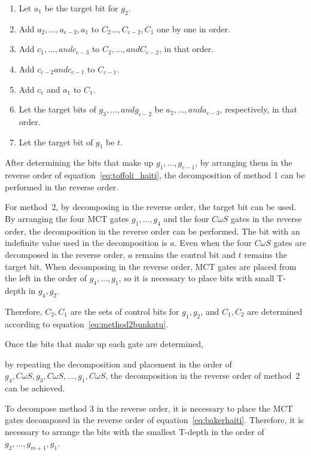 \begin{enumerate}[Step 1]

\item Let $a_{1}$ be the target bit for $g_{2}$.

\item Add $a_{2},\dots,a_{c-2},a_{1}$ to $C_{2}\dots,C_{c-2},C_{1}$ one by one in order.

\item Add $c_{1}, \dots , and c_{c-3}$ to $C_{2}, \dots , and C_{c-2}$, in that order.
\item Add $c_{c-2} and c_{c-1}$ to $C_{c-1}$.
\item Add $c_{c}$ and $a_{1}$ to $C_{1}$.
\item Let the target bits of $g_{3}, \dots , and g_{c-2}$ be $a_{2}, \dots , and a_{c-3}$, respectively, in that order.
\item Let the target bit of $g_{1}$ be $t$.
\end{enumerate}
After determining the bits that make up $g_{1},\dots, g_{c-1}$,
by arranging them in the reverse order of equation~\ref{eq:toffoli_haiti},
the decomposition of method 1 can be performed in the reverse order.
\par
For method~2, by decomposing in the reverse order, the target bit can be used.
By arranging the four MCT gates $g_{1},\dots, g_{4}$ and the four $C\omega S$ gates in the reverse order, the decomposition in the reverse order can be performed.
The bit with an indefinite value used in the decomposition is $a$.
Even when the four $C\omega S$ gates are decomposed in the reverse order, $a$ remains the control bit and $t$ remains the target bit.
When decomposing in the reverse order, MCT gates are placed from the left in the order of $g_{4}, \dots, g_{1}$, so it is necessary to place bits with small T-depth in $g_{4}, g_{2}$.

Therefore, $C_{2}, C_{1}$ are the sets of control bits for $g_{1}, g_{2}$,
and $C_{1}, C_{2}$ are determined according to equation~\ref{eq:method2bunkatu}.

Once the bits that make up each gate are determined,

by repeating the decomposition and placement in the order of $g_{4}, C\omega S, g_{3}, C\omega S, \dots , g_{1}, C\omega S$,
the decomposition in the reverse order of method~2 can be achieved.

\par
To decompose method 3 in the reverse order,
it is necessary to place the MCT gates decomposed in the reverse order of equation~\ref{eq:bakerhaiti}.
Therefore, it is necessary to arrange the bits with the smallest T-depth in the order of $g_{2}, \dots, g_{m+1}, g_{1}$.

